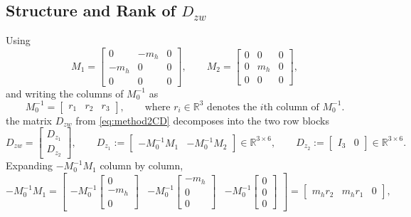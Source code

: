 \documentclass[11pt]{article}
\newcommand{\R}{\mathbb{R}}
\begin{document}
\subsection{Structure and Rank of $D_{zw}$}
Using
\begin{equation}
    M_1 =
    \begin{bmatrix}
        0 & -m_h & 0 \\
        -m_h & 0 & 0 \\
        0 & 0 & 0
    \end{bmatrix},
    \qquad
    M_2 =
    \begin{bmatrix}
        0 & 0 & 0 \\
        0 & m_h & 0 \\
        0 & 0 & 0
    \end{bmatrix},
    \label{eq:M1M2}
\end{equation}
and writing the columns of $M_0^{-1}$ as
\begin{equation}
    M_0^{-1} = \begin{bmatrix} r_1 & r_2 & r_3 \end{bmatrix},
    \qquad
    \text{where } r_i \in \R^3 \text{ denotes the $i$th column of } M_0^{-1}.
    \label{eq:rcols}
\end{equation}
the matrix $D_{zw}$ from \eqref{eq:method2CD} decomposes into the two row blocks
\begin{equation}
    D_{zw} =
    \begin{bmatrix}
        D_{z_1} \\ D_{z_2}
    \end{bmatrix},
    \qquad
    D_{z_1} := \begin{bmatrix} -M_0^{-1}M_1 & -M_0^{-1}M_2 \end{bmatrix} \in \R^{3\times 6},
    \qquad
    D_{z_2} := \begin{bmatrix} I_3 & 0 \end{bmatrix} \in \R^{3\times 6}.
    \label{eq:DzwBlocks}
\end{equation}
Expanding $-M_0^{-1}M_1$ column by column,
\begin{equation}
    -M_0^{-1}M_1
    =
    \begin{bmatrix}
        -M_0^{-1}\!\begin{bmatrix} 0 \\ -m_h \\ 0 \end{bmatrix} &
        -M_0^{-1}\!\begin{bmatrix} -m_h \\ 0 \\ 0 \end{bmatrix} &
        -M_0^{-1}\!\begin{bmatrix} 0 \\ 0 \\ 0 \end{bmatrix}
    \end{bmatrix}
    =
    \begin{bmatrix}
        m_h r_2 & m_h r_1 & 0
    \end{bmatrix},
    \label{eq:M0invM1}
\end{equation}
\end{document}
